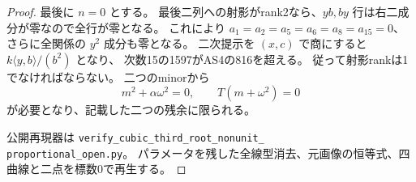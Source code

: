 \begin{proof}
最後に $n=0$ とする。
最後二列への射影がrank2なら、$yb,by$ 行は右二成分が零なので全行が零となる。
これにより
$a_1=a_2=a_5=a_6=a_8=a_{15}=0$、さらに全関係の $y^2$ 成分も零となる。
二次提示を $(x,c)$ で商にすると $k\langle y,b\rangle/(b^2)$ となり、
次数15の1597がAS4の816を超える。
従って射影rankは1でなければならない。
二つのminorから
\[
 m^2+\alpha\omega^2=0,\qquad T(m+\omega^2)=0
\]
が必要となり、記載した二つの残余に限られる。

公開再現器は \texttt{verify\_cubic\_third\_root\_nonunit\_}\\
\texttt{proportional\_open.py}。
パラメータを残した全線型消去、元画像の恒等式、四曲線と二点を標数0で再生する。
\end{proof}
